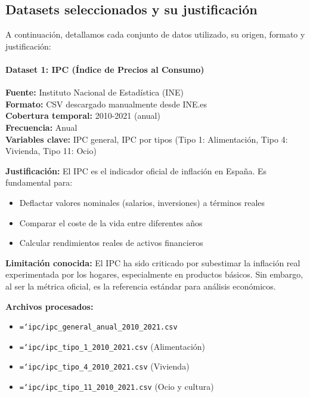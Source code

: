 \documentclass{article}
\let\oldtexttt\texttt  %
\renewcommand{\texttt}[1]{{\footnotesize\oldtexttt{\hyphenchar\font=`\-#1}}}  %
\begin{document}
\subsection{Datasets seleccionados y su justificaci\'on}

A continuaci\'on, detallamos cada conjunto de datos utilizado, su origen, formato y justificaci\'on:

\paragraph{Dataset 1: IPC (\'Indice de Precios al Consumo)}

\textbf{Fuente:} Instituto Nacional de Estad\'istica (INE)\\
\textbf{Formato:} CSV descargado manualmente desde INE.es\\
\textbf{Cobertura temporal:} 2010-2021 (anual)\\
\textbf{Frecuencia:} Anual\\
\textbf{Variables clave:} IPC general, IPC por tipos (Tipo 1: Alimentaci\'on, Tipo 4: Vivienda, Tipo 11: Ocio)

\textbf{Justificaci\'on:} El IPC es el indicador oficial de inflaci\'on en Espa\~na. Es fundamental para:
\begin{itemize}
    \item Deflactar valores nominales (salarios, inversiones) a t\'erminos reales
    \item Comparar el coste de la vida entre diferentes a\~nos
    \item Calcular rendimientos reales de activos financieros
\end{itemize}

\textbf{Limitaci\'on conocida:} El IPC ha sido criticado por subestimar la inflaci\'on real experimentada por los hogares, especialmente en productos b\'asicos. Sin embargo, al ser la m\'etrica oficial, es la referencia est\'andar para an\'alisis econ\'omicos.

\textbf{Archivos procesados:}
\begin{itemize}
    \item \texttt{ipc/ipc\_general\_anual\_2010\_2021.csv}
    \item \texttt{ipc/ipc\_tipo\_1\_2010\_2021.csv} (Alimentaci\'on)
    \item \texttt{ipc/ipc\_tipo\_4\_2010\_2021.csv} (Vivienda)
    \item \texttt{ipc/ipc\_tipo\_11\_2010\_2021.csv} (Ocio y cultura)
\end{itemize}
\end{document}
